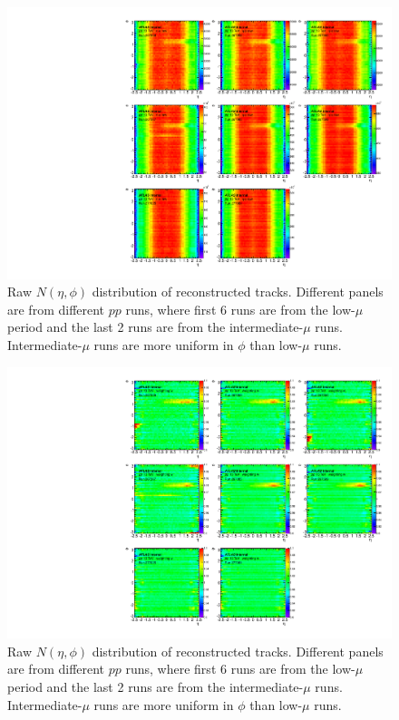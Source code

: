 \begin{figure}[H]
\centering
\includegraphics[width=1.\linewidth]{figs/sec_ana/flatten_pp13_2D_run_before.pdf}
\caption{Raw $N(\eta,\phi)$ distribution of reconstructed tracks. Different panels are from different $pp$ runs, where first 6 runs are from the low-$\mu$ period and the last 2 runs are from the intermediate-$\mu$ runs. Intermediate-$\mu$ runs are more uniform in $\phi$ than low-$\mu$ runs.}
\label{fig:flatten_pp13_2D_run_before}
\end{figure}

\begin{figure}[H]
\centering
\includegraphics[width=1.\linewidth]{figs/sec_ana/flatten_pp13_2D_run_wei.pdf}
\caption{Raw $N(\eta,\phi)$ distribution of reconstructed tracks. Different panels are from different $pp$ runs, where first 6 runs are from the low-$\mu$ period and the last 2 runs are from the intermediate-$\mu$ runs. Intermediate-$\mu$ runs are more uniform in $\phi$ than low-$\mu$ runs.}
\label{fig:flatten_pp13_2D_run_wei}
\end{figure}

